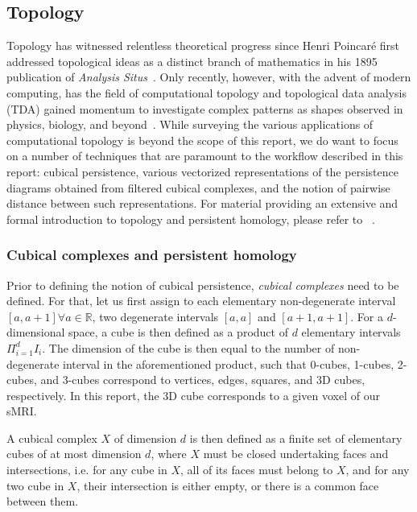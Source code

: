 \documentclass{article}
\begin{document}
\subsection{Topology}

Topology has witnessed relentless theoretical progress since Henri Poincaré first addressed topological ideas as a distinct branch of mathematics in his 1895 publication of \textit{Analysis Situs}~\citep{poincare1895analysis, james1999history}. Only recently, however, with the advent of modern computing, has the field of computational topology and topological data analysis (TDA) gained momentum to investigate complex patterns as shapes observed in physics, biology, and beyond~\citep{ghrist2008barcodes, dey1999computational, amezquita2020shape}. While surveying the various applications of computational topology is beyond the scope of this report, we do want to focus on a number of techniques that are paramount to the workflow described in this report: cubical persistence, various vectorized representations of the persistence diagrams obtained from filtered cubical complexes, and the notion of pairwise distance between such representations. For material providing an extensive and formal introduction to topology and persistent homology, please refer to ~\citep{freedman2009algebraic, edelsbrunner2010computational, ghrist2008barcodes}.


\subsubsection{Cubical complexes and persistent homology}

Prior to defining the notion of cubical persistence, \emph{cubical complexes} need to be defined. For that, let us first assign to each elementary non-degenerate interval $[a,a+1]\forall a\in\mathbb{R}$, two degenerate intervals $[a,a]$ and $[a+1,a+1]$. For a $d$-dimensional space, a cube is then defined as a product of $d$ elementary intervals $\Pi_{i=1}^{d}I_i$. The dimension of the cube is then equal to the number of non-degenerate interval in the aforementioned product, such that 0-cubes, 1-cubes, 2-cubes, and 3-cubes correspond to vertices, edges, squares, and 3D cubes, respectively. In this report, the 3D cube corresponds to a given voxel of our sMRI.

A cubical complex $X$ of dimension $d$ is then defined as a finite set of elementary cubes of at most dimension $d$, where $X$ must be closed undertaking faces and intersections, i.e. for any cube in $X$, all of its faces must belong to $X$, and for any two cube in $X$, their intersection is either empty, or there is a common face between them.
\end{document}

